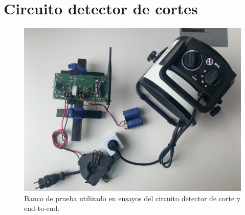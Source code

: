 \section{Circuito detector de cortes}
\begin{figure}
	\centering
	\includegraphics[width=1.0\linewidth]{Figures/banco_prueba_e2e_1}
	\caption{Banco de prueba utilizado en ensayos del circuito detector de corte y end-to-end.}
	\label{fig:bancopruebae2e2}
\end{figure}

